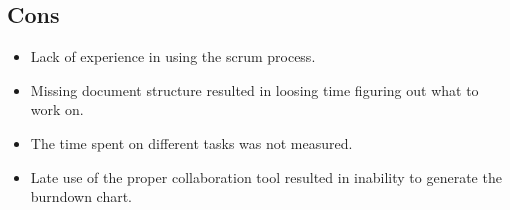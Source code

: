 \subsection{Cons}
\begin{itemize}
\item Lack of experience in using the scrum process.
\item Missing document structure resulted in loosing time figuring out what to work on.
\item The time spent on different tasks was not measured.
\item Late use of the proper collaboration tool resulted in inability to generate the burndown chart.
\end{itemize}
